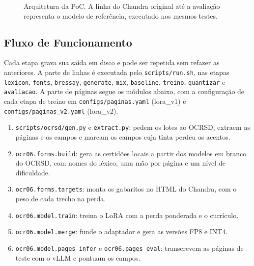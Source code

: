 \documentclass[12pt,a4paper]{article}
\begin{document}
\begin{figure}[H]
\caption{Arquitetura da PoC. A linha do Chandra original até a avaliação representa o modelo de referência, executado nos mesmos testes.}
\label{fig:arquitetura}
\end{figure}

\subsection{Fluxo de Funcionamento}

Cada etapa grava sua saída em disco e pode ser repetida sem refazer as anteriores. A parte de linhas é executada pelo \texttt{scripts/run.sh}, nas etapas \texttt{lexicon}, \texttt{fonts}, \texttt{bressay}, \texttt{generate}, \texttt{mix}, \texttt{baseline}, \texttt{treino}, \texttt{quantizar} e \texttt{avaliacao}. A parte de páginas segue os módulos abaixo, com a configuração de cada etapa de treino em \texttt{configs/paginas.yaml} (lora\_v1) e \texttt{configs/paginas\_v2.yaml} (lora\_v2).

\begin{enumerate}
    \item \texttt{scripts/ocrsd/gen.py} e \texttt{extract.py}: pedem os lotes ao OCRSD, extraem as páginas e os campos e marcam os campos cuja tinta perdeu os acentos.
    \item \texttt{ocr06.forms.build}: gera as certidões locais a partir dos modelos em branco do OCRSD, com nomes do léxico, uma mão por página e um nível de dificuldade.
    \item \texttt{ocr06.forms.targets}: monta os gabaritos no HTML do Chandra, com o peso de cada trecho na perda.
    \item \texttt{ocr06.model.train}: treina o LoRA com a perda ponderada e o currículo.
    \item \texttt{ocr06.model.merge}: funde o adaptador e gera as versões FP8 e INT4.
    \item \texttt{ocr06.model.pages\_infer} e \texttt{ocr06.pages\_eval}: transcrevem as páginas de teste com o vLLM e pontuam os campos.
\end{enumerate}
\end{document}
